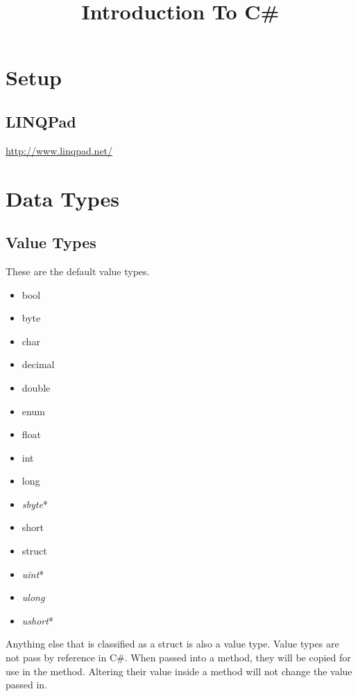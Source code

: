 \documentclass {amsart}
\title{Introduction To C\#}
\begin{document}
\maketitle


\section{Setup}
	\subsection{LINQPad}
		\url{http://www.linqpad.net/}

\section{Data Types}
	\subsection{Value Types}  These are the default value types. 
		\begin{itemize}
			\item bool
			\item byte
			\item char
			\item decimal
			\item double
			\item enum
			\item float
			\item int
			\item long
			\item \emph{sbyte}*
			\item short
			\item struct
			\item \emph{uint}*
			\item \emph{ulong}
			\item \emph{ushort}*
		\end{itemize}
		Anything else that is classified as a struct is also a value type. \vspace{.5cm}  Value types are not pass by reference in C\#.  When passed into a method, they will be copied for use in the method.  Altering their value inside a method will not change the value passed in.

		\begin{lstlisting}

			


		\end{lstlisting}  
\end{document}

